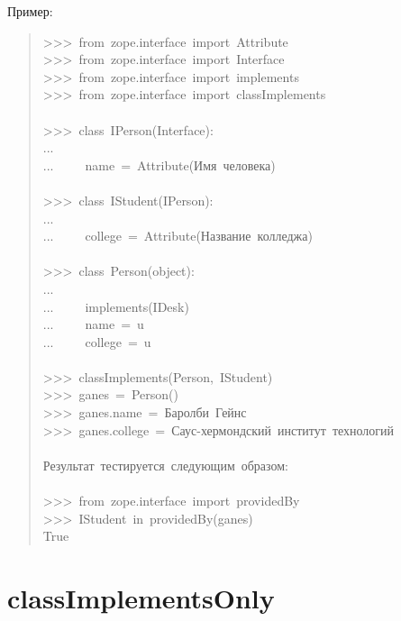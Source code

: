 \documentclass[14pt,a4paper,openany,twoside,final]{extbook}
\begin{document}
Пример:

\begin{quote}{\ttfamily \raggedright \noindent
>{}>{}>~from~zope.interface~import~Attribute\\
>{}>{}>~from~zope.interface~import~Interface\\
>{}>{}>~from~zope.interface~import~implements\\
>{}>{}>~from~zope.interface~import~classImplements\\
~\\
>{}>{}>~class~IPerson(Interface):\\
...\\
...~~~~~name~=~Attribute(\textquotedbl{}Имя~человека\textquotedbl{})\\
~\\
>{}>{}>~class~IStudent(IPerson):\\
...\\
...~~~~~college~=~Attribute(\textquotedbl{}Название~колледжа\textquotedbl{})\\
~\\
>{}>{}>~class~Person(object):\\
...\\
...~~~~~implements(IDesk)\\
...~~~~~name~=~u\textquotedbl{}\textquotedbl{}\\
...~~~~~college~=~u\textquotedbl{}\textquotedbl{}\\
~\\
>{}>{}>~classImplements(Person,~IStudent)\\
>{}>{}>~ganes~=~Person()\\
>{}>{}>~ganes.name~=~\textquotedbl{}Баролби~Гейнс\textquotedbl{}\\
>{}>{}>~ganes.college~=~\textquotedbl{}Саус-хермондский~институт~технологий\textquotedbl{}\\
~\\
Результат~тестируется~следующим~образом:\\
~\\
>{}>{}>~from~zope.interface~import~providedBy\\
>{}>{}>~IStudent~in~providedBy(ganes)\\
True
}
\end{quote}


\section*{classImplementsOnly%
  \label{classimplementsonly}%
}
\end{document}
